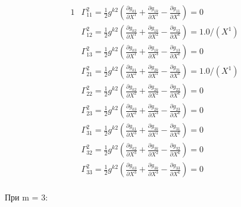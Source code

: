 \documentclass[a4paper, 12pt, oneside]{article}
\begin{document}
\begin{alignat*}{1}
  & \Gamma^2_{11} = \frac{1}{2}g^{k2}(\frac{\partial g_{k1}}{\partial X^1} + \frac{\partial g_{1k}}{\partial X^1} - \frac{\partial g_{11}}{\partial X^k}) = 0 \\
  & \Gamma^2_{12} = \frac{1}{2}g^{k2}(\frac{\partial g_{k2}}{\partial X^1} + \frac{\partial g_{1k}}{\partial X^2} - \frac{\partial g_{12}}{\partial X^k}) = 1.0/(X^1) \\
  & \Gamma^2_{13} = \frac{1}{2}g^{k2}(\frac{\partial g_{k3}}{\partial X^1} + \frac{\partial g_{1k}}{\partial X^3} - \frac{\partial g_{13}}{\partial X^k}) = 0 \\
  & \Gamma^2_{21} = \frac{1}{2}g^{k2}(\frac{\partial g_{k1}}{\partial X^2} + \frac{\partial g_{2k}}{\partial X^1} - \frac{\partial g_{21}}{\partial X^k}) = 1.0/(X^1) \\
  & \Gamma^2_{22} = \frac{1}{2}g^{k2}(\frac{\partial g_{k2}}{\partial X^2} + \frac{\partial g_{2k}}{\partial X^2} - \frac{\partial g_{22}}{\partial X^k}) = 0 \\
  & \Gamma^2_{23} = \frac{1}{2}g^{k2}(\frac{\partial g_{k3}}{\partial X^2} + \frac{\partial g_{2k}}{\partial X^3} - \frac{\partial g_{23}}{\partial X^k}) = 0 \\
  & \Gamma^2_{31} = \frac{1}{2}g^{k2}(\frac{\partial g_{k1}}{\partial X^3} + \frac{\partial g_{3k}}{\partial X^1} - \frac{\partial g_{31}}{\partial X^k}) = 0 \\
  & \Gamma^2_{32} = \frac{1}{2}g^{k2}(\frac{\partial g_{k2}}{\partial X^3} + \frac{\partial g_{3k}}{\partial X^2} - \frac{\partial g_{32}}{\partial X^k}) = 0 \\
  & \Gamma^2_{33} = \frac{1}{2}g^{k2}(\frac{\partial g_{k3}}{\partial X^3} + \frac{\partial g_{3k}}{\partial X^3} - \frac{\partial g_{33}}{\partial X^k}) = 0 
\end{alignat*}\\
При m = 3:\\
\end{document}
